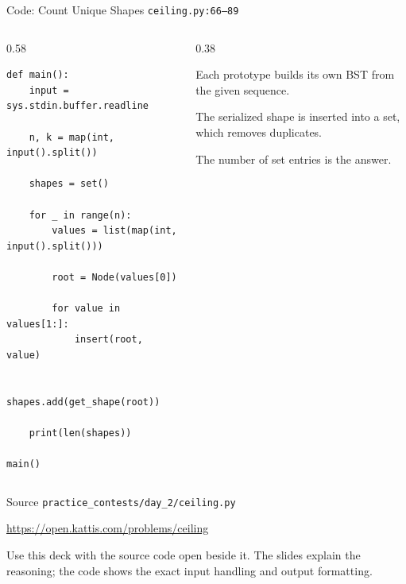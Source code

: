 \documentclass[aspectratio=169,11pt]{beamer}
\begin{document}
\begin{frame}[fragile]{Code: Count Unique Shapes}
\scriptsize
{} \texttt{ceiling.py:66--89}

\vspace{0.08cm}
\begin{columns}[T,totalwidth=\textwidth]
\begin{column}{0.58\textwidth}
\begin{lstlisting}[style=cpcode]
def main():
    input = sys.stdin.buffer.readline

    n, k = map(int, input().split())

    shapes = set()

    for _ in range(n):
        values = list(map(int, input().split()))

        root = Node(values[0])

        for value in values[1:]:
            insert(root, value)

        shapes.add(get_shape(root))

    print(len(shapes))

main()
\end{lstlisting}
\end{column}
\begin{column}{0.38\textwidth}
\begin{tightitemize}
  \item Each prototype builds its own BST from the given sequence.
  \item The serialized shape is inserted into a set, which removes duplicates.
  \item The number of set entries is the answer.
\end{tightitemize}
\end{column}
\end{columns}
\end{frame}

\begin{frame}{Source}
\small
{} \texttt{practice\_contests/day\_2/ceiling.py}

\vspace{0.3cm}
 \url{https://open.kattis.com/problems/ceiling}

\vspace{0.45cm}
Use this deck with the source code open beside it. The slides explain the reasoning; the code shows the exact input handling and output formatting.
\end{frame}
\end{document}
